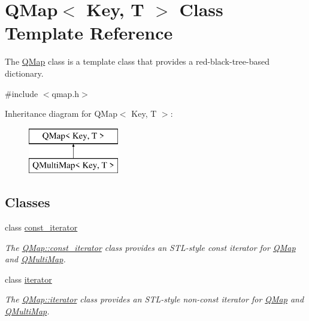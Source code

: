 \hypertarget{class_q_map}{}\section{Q\+Map$<$ Key, T $>$ Class Template Reference}
\label{class_q_map}


The \hyperlink{class_q_map}{Q\+Map} class is a template class that provides a red-\/black-\/tree-\/based dictionary.  




{\ttfamily \#include $<$qmap.\+h$>$}

Inheritance diagram for Q\+Map$<$ Key, T $>$\+:\begin{figure}[H]
\begin{center}
\leavevmode
\includegraphics[height=2.000000cm]{class_q_map}
\end{center}
\end{figure}
\subsection*{Classes}
\begin{DoxyCompactItemize}
\item 
class \hyperlink{class_q_map_1_1const__iterator}{const\+\_\+iterator}
\begin{DoxyCompactList}\small\item\em The \hyperlink{class_q_map_1_1const__iterator}{Q\+Map\+::const\+\_\+iterator} class provides an S\+T\+L-\/style const iterator for \hyperlink{class_q_map}{Q\+Map} and \hyperlink{class_q_multi_map}{Q\+Multi\+Map}. \end{DoxyCompactList}\item 
class \hyperlink{class_q_map_1_1iterator}{iterator}
\begin{DoxyCompactList}\small\item\em The \hyperlink{class_q_map_1_1iterator}{Q\+Map\+::iterator} class provides an S\+T\+L-\/style non-\/const iterator for \hyperlink{class_q_map}{Q\+Map} and \hyperlink{class_q_multi_map}{Q\+Multi\+Map}. \end{DoxyCompactList}\end{DoxyCompactItemize}
